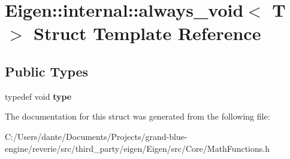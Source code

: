 \hypertarget{struct_eigen_1_1internal_1_1always__void}{}\section{Eigen\+::internal\+::always\+\_\+void$<$ T $>$ Struct Template Reference}
\label{struct_eigen_1_1internal_1_1always__void}
\subsection*{Public Types}
\begin{DoxyCompactItemize}
\item 
\mbox{\label{struct_eigen_1_1internal_1_1always__void_ad8099dc06c2a4d6afb86bba3e8f49d3a}} 
typedef void {\bfseries type}
\end{DoxyCompactItemize}


The documentation for this struct was generated from the following file\+:\begin{DoxyCompactItemize}
\item 
C\+:/\+Users/dante/\+Documents/\+Projects/grand-\/blue-\/engine/reverie/src/third\+\_\+party/eigen/\+Eigen/src/\+Core/Math\+Functions.\+h\end{DoxyCompactItemize}
